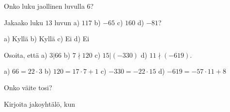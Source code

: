 \begin{tehtavasivu}

\begin{tehtava}
    Onko luku
    jaollinen luvulla $6$?
    \begin{vastaus}
    \end{vastaus}

\end{tehtava}

\begin{tehtava}
    Jakaako luku $13$ luvun a) $117$ b) $-65$ c) $160$ d) $-81$?
    \begin{vastaus}
        a) Kyllä b) Kyllä c) Ei d) Ei 
    \end{vastaus}
\end{tehtava}

\begin{tehtava}
    Osoita, että a) $3|66$ b) $7\nmid 120$ c) $15|(-330)$ d) $11\nmid (-619)$.
    \begin{vastaus}
        a) $66 = 22\cdot 3$ b) $120 = 17\cdot 7 + 1$ c) $-330 = -22\cdot 15$ d) $-619 = -57\cdot 11 + 8$ 
    \end{vastaus}

\end{tehtava}

\begin{tehtava}
    Onko väite tosi?
    
    \begin{vastaus}
    \end{vastaus}
\end{tehtava}

\begin{tehtava}
    Kirjoita jakoyhtälö, kun
    
    \begin{vastaus}
    \end{vastaus}
\end{tehtava}


\end{tehtavasivu}

